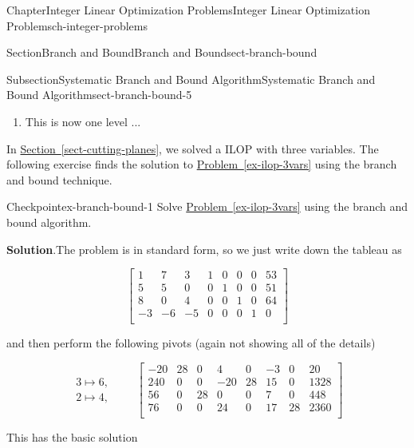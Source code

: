 \documentclass[oneside,10pt,]{book}
\newcommand{\blocktitlefont}{\relax}
\newcommand{\xreffont}{\relax}
\numberwithin{equation}{section}
\newcommand{\amp}{&}
\begin{document}
\begin{chapterptx}{Chapter}{Integer Linear Optimization Problems}{}{Integer Linear Optimization Problems}{}{}{ch-integer-problems}
\begin{sectionptx}{Section}{Branch and Bound}{}{Branch and Bound}{}{}{sect-branch-bound}
\begin{subsectionptx}{Subsection}{Systematic Branch and Bound Algorithm}{}{Systematic Branch and Bound Algorithm}{}{}{sect-branch-bound-5}
\begin{enumerate}
\item{}This is now one level ...%
\end{enumerate}
%
\par
In \hyperref[sect-cutting-planes]{Section~{\xreffont\ref{sect-cutting-planes}}}, we solved a ILOP with three variables. The following exercise finds the solution to \hyperref[ex-ilop-3vars]{Problem~{\xreffont\ref{ex-ilop-3vars}}} using the branch and bound technique.%
\begin{inlineexercise}{Checkpoint}{}{ex-branch-bound-1}%
Solve \hyperref[ex-ilop-3vars]{Problem~{\xreffont\ref{ex-ilop-3vars}}} using the branch and bound algorithm.%
\par\smallskip%
\noindent\textbf{\blocktitlefont Solution}.\hypertarget{ex-branch-bound-1-2}{}\quad{}The problem is in standard form, so we just write down the tableau as%
\par
%
\begin{equation*}
\left[\begin{array}{rrr|rrrr|r} 1 \amp 7 \amp 3 \amp 1 \amp 0 \amp 0 \amp 0 \amp 53\\ 5 \amp 5 \amp 0 \amp 0 \amp 1 \amp 0 \amp 0 \amp 51\\ 8 \amp 0 \amp 4 \amp 0 \amp 0 \amp 1 \amp 0 \amp 64\\ \hline -3 \amp -6 \amp -5 \amp 0 \amp 0 \amp 0 \amp 1 \amp 0\\ \end{array} \right]
\end{equation*}
%
\par
and then perform the following pivots (again not showing all of the details)%
\par
%
\begin{equation*}
\begin{array}{r} 3 \mapsto 6, \\ 2 \mapsto 4, \end{array} \qquad \left[\begin{array}{rrr|rrrr|r} -20 \amp 28 \amp 0 \amp 4 \amp 0 \amp -3 \amp 0 \amp 20\\ 240 \amp 0 \amp 0 \amp -20 \amp 28 \amp 15 \amp 0 \amp 1328\\ 56 \amp 0 \amp 28 \amp 0 \amp 0 \amp 7 \amp 0 \amp 448\\ \hline 76 \amp 0 \amp 0 \amp 24 \amp 0 \amp 17 \amp 28 \amp 2360\\ \end{array} \right]
\end{equation*}
%
\par
This has the basic solution%

\end{inlineexercise}
\end{subsectionptx}
\end{sectionptx}
\end{chapterptx}
\end{document}
